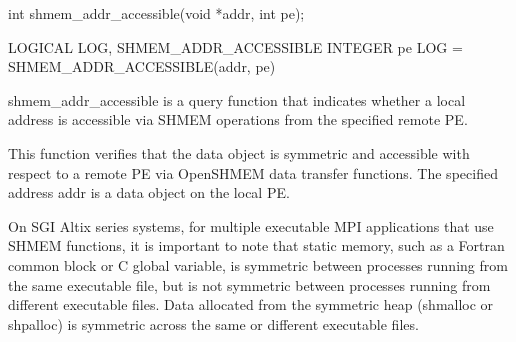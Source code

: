 
\synC
int shmem_addr_accessible(void *addr, int pe);

\synF
LOGICAL LOG, SHMEM_ADDR_ACCESSIBLE
INTEGER pe
LOG = SHMEM_ADDR_ACCESSIBLE(addr, pe)


{
       shmem\_addr\_accessible  is  a  query  function  that indicates whether a
       local address is accessible via SHMEM  operations  from	the  specified
       remote \ac{PE}.
       
			 This function verifies that the data object is symmetric and accessible
       with respect to a remote \ac{PE} via OpenSHMEM  data  transfer  functions.   The
       specified address addr is a data object on the local \ac{PE}.

       On  SGI	Altix series systems, for multiple executable MPI applications
       that use SHMEM functions, it is important to note that  static  memory,
       such  as	 a  Fortran  common  block  or C global variable, is symmetric
       between processes running from the same executable  file,  but  is  not
       symmetric  between  processes  running from different executable files.
       Data allocated from  the	 symmetric  heap  (shmalloc  or	 shpalloc)  is
       symmetric across the same or different executable files.
}
{
		\desTB{}
		{
				\cRow{}{}
		}
		\notesB{
		}
}


\eAPI
